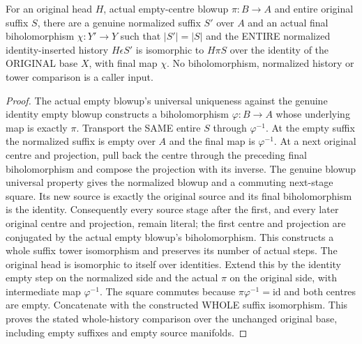 \begin{theorem}
\label{hir:original-actual-empty-whole-suffix-normalization}
\leanok
For an original head $H$, actual empty-centre blowup $\pi:B\to A$ and entire
original suffix $S$, there are a genuine normalized suffix $S'$ over $A$ and
an actual final biholomorphism $\chi:Y'\to Y$ such that $|S'|=|S|$ and the
ENTIRE normalized identity-inserted history $H\epsilon S'$ is isomorphic to
$H\pi S$ over the identity of the ORIGINAL base $X$, with final map $\chi$.
No biholomorphism, normalized history or tower comparison is a caller input.
\end{theorem}
\begin{proof}
The actual empty blowup's universal uniqueness against the genuine identity
empty blowup constructs a biholomorphism $\varphi:B\to A$ whose underlying
map is exactly $\pi$. Transport the SAME entire $S$ through $\varphi^{-1}$.
At the empty suffix the normalized suffix is empty over $A$ and the final
map is $\varphi^{-1}$. At a next original centre and projection, pull back
the centre through the preceding final biholomorphism and compose the
projection with its inverse. The genuine blowup universal property gives
the normalized blowup and a commuting next-stage square. Its new source is
exactly the original source and its final biholomorphism is the identity.
Consequently every source stage after the first, and every later original
centre and projection, remain literal; the first centre and projection are
conjugated by the actual empty blowup's biholomorphism. This constructs a
whole suffix tower isomorphism and preserves its number of actual steps.
The original head is isomorphic to itself over identities. Extend this by
the identity empty step on the normalized side and the actual $\pi$ on the
original side, with intermediate map $\varphi^{-1}$. The square commutes
because $\pi\varphi^{-1}=\mathrm{id}$ and both centres are empty. Concatenate
with the constructed WHOLE suffix isomorphism. This proves the stated
whole-history comparison over the unchanged original base, including empty
suffixes and empty source manifolds.
\end{proof}

